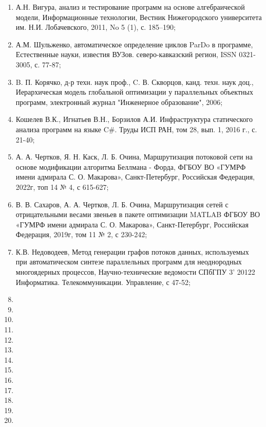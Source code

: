 \begin{enumerate}
    \item А.Н. Вигура, анализ и тестирование программ на основе алгебраической модели, Информационные технологии, Вестник Нижегородского университета им. Н.И. Лобачевского, 2011, No 5 (1), с. 185–190;
    \item А.М. Шульженко, автоматическое определение циклов ParDo в программе, Естественные науки, известия ВУЗов. северо-кавказский регион, ISSN 0321-3005, с. 77-87;
    \item B. П. Корячко, д-р техн. наук проф., C. В. Скворцов, канд. техн. наук доц., Иерархическая модель глобальной оптимизации у параллельных объектных программ, электронный журнал "Инженерное образование", 2006; 
    \item Кошелев В.К., Игнатьев В.Н., Борзилов А.И. Инфраструктура статического анализа программ на языке C\#. Труды ИСП РАН, том 28, вып. 1, 2016 г., с. 21-40;
    \item А. А. Чертков, Я. Н. Каск, Л. Б. Очина, Маршрутизация потоковой сети на основе модификации алгоритма Беллмана - Форда, ФГБОУ ВО «ГУМРФ имени адмирала С. О. Макарова», Санкт-Петербург, Российская Федерация, 2022г, топ 14 № 4, с 615-627;
    \item В. В. Сахаров, А. А. Чертков, Л. Б. Очина, Маршрутизация сетей с отрицательными весами звеньев в пакете оптимизации MATLAB ФГБОУ ВО «ГУМРФ имени адмирала С. О. Макарова», Санкт-Петербург, Российская Федерация, 2019г, том 11 № 2, с 230-242;
    \item К.В. Недоводеев, Метод генерации графов потоков данных, используемых при автоматическом синтезе параллельных программ для неоднородных многоядерных процессов, Научно-технические ведомости СПбГПУ 3' 20122 Информатика. Телекоммуникации. Управление, с 47-52;
    \item 
    \item
    \item
    \item
    \item
    \item
    \item
    \item
    \item
    \item
    \item
    \item
    \item
\end{enumerate}
